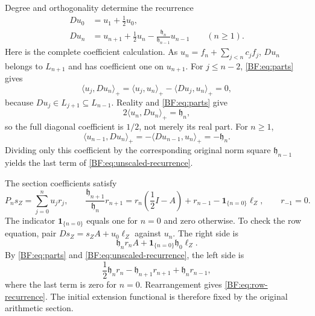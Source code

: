 Degree and orthogonality determine the recurrence
\begin{equation}
\begin{split}
Du_0&=u_1+\frac12u_0,\\
Du_n&=u_{n+1}+\frac12u_n
          -\frac{\mathfrak h_n}{\mathfrak h_{n-1}}u_{n-1}
          \qquad(n\ge1).
\end{split}
\tag{BF.14}\label{BF:eq:unscaled-recurrence}
\end{equation}
Here is the complete coefficient calculation.  As
\(u_n=f_n+\sum_{j<n}c_jf_j\), \(Du_n\) belongs to \(L_{n+1}\)
and has coefficient one on \(u_{n+1}\).
For \(j\le n-2\), \eqref{BF:eq:parts} gives
\[
\langle u_j,Du_n\rangle_+
=\langle u_j,u_n\rangle_+-\langle Du_j,u_n\rangle_+=0,
\]
because \(Du_j\in L_{j+1}\subseteq L_{n-1}\).
Reality and \eqref{BF:eq:parts} give
\[
2\langle u_n,Du_n\rangle_+=\mathfrak h_n,
\]
so the full diagonal coefficient is \(1/2\), not merely its real
part.  For \(n\ge1\),
\[
\langle u_{n-1},Du_n\rangle_+
=-\langle Du_{n-1},u_n\rangle_+=-\mathfrak h_n.
\]
Dividing only this coefficient by the corresponding original norm
square \(\mathfrak h_{n-1}\) yields the last term of
\eqref{BF:eq:unscaled-recurrence}.

The section coefficients satisfy
\begin{equation}
P_ns_Z=\sum_{j=0}^nu_jr_j,\qquad
\frac{\mathfrak h_{n+1}}{\mathfrak h_n}r_{n+1}
=r_n\left(\frac12I-A\right)+r_{n-1}
   -\mathbf 1_{\{n=0\}}\ell_Z,\qquad r_{-1}=0.
\tag{BF.15}\label{BF:eq:row-recurrence}
\end{equation}
The indicator \(\mathbf 1_{\{n=0\}}\) equals one for \(n=0\)
and zero otherwise.  To check the row equation, pair
\(Ds_Z=s_ZA+u_0\ell_Z\) against \(u_n\).
The right side is
\[
\mathfrak h_nr_nA+\mathbf 1_{\{n=0\}}\mathfrak h_0\ell_Z.
\]
By \eqref{BF:eq:parts} and \eqref{BF:eq:unscaled-recurrence}, the
left side is
\[
\frac12\mathfrak h_nr_n-\mathfrak h_{n+1}r_{n+1}
+\mathfrak h_nr_{n-1},
\]
where the last term is zero for \(n=0\).  Rearrangement gives
\eqref{BF:eq:row-recurrence}.  The initial extension functional is
therefore fixed by the original arithmetic section.

